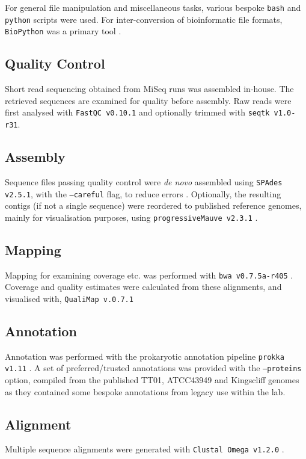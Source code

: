 For general file manipulation and miscellaneous tasks, various bespoke \texttt{bash} and \texttt{python} scripts were used. For inter-conversion of bioinformatic file formats, \texttt{BioPython} was a primary tool \citep{Cock2009}.

\subsection{Quality Control}
Short read sequencing obtained from MiSeq runs was assembled in-house. The retrieved sequences are examined for quality before assembly. Raw reads were first analysed with \texttt{FastQC v0.10.1} and optionally trimmed with \texttt{seqtk v1.0-r31}.

\subsection{Assembly}
Sequence files passing quality control were \emph{de novo} assembled using \texttt{SPAdes v2.5.1}, with the \texttt{--careful} flag, to reduce errors \citep{Bankevich2012}.  Optionally, the resulting contigs (if not a single sequence) were reordered to published reference genomes, mainly for visualisation purposes, using \texttt{progressiveMauve v2.3.1} \citep{Darling2010}.

\subsection{Mapping}
Mapping for examining coverage etc. was performed with \texttt{bwa v0.7.5a-r405} \citep{Li2009}. Coverage and quality estimates were calculated from these alignments, and visualised with, \texttt{QualiMap v.0.7.1} \citep{Garcia-Alcalde2012}

\subsection{Annotation}\label{prokka}
Annotation was performed with the prokaryotic annotation pipeline \texttt{prokka v1.11} \citep{Seemann2014}. A set of preferred/trusted annotations was provided with the \texttt{--proteins} option, compiled from the published \Plum{} TT01,  \Pasy{} ATCC43949 and \Pasy{} Kingscliff genomes as they contained some bespoke annotations from legacy use within the lab.

\subsection{Alignment}
Multiple sequence alignments were generated with \texttt{Clustal Omega v1.2.0} \citep{Sievers2011}.

